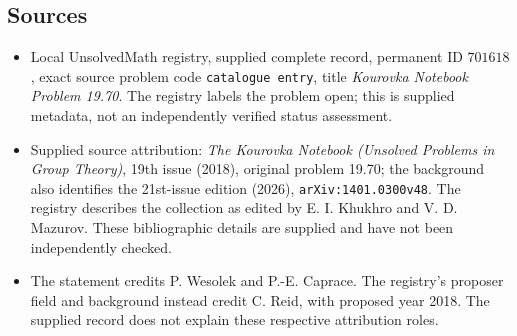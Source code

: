 \documentclass[11pt]{article}
\begin{document}
\subsection{Sources}
\begin{itemize}
\item Local UnsolvedMath registry, supplied complete record, permanent ID \(701618\), exact source problem code \texttt{catalogue entry}, title \emph{Kourovka Notebook Problem 19.70}. The registry labels the problem open; this is supplied metadata, not an independently verified status assessment.
\item Supplied source attribution: \emph{The Kourovka Notebook (Unsolved Problems in Group Theory)}, 19th issue (2018), original problem 19.70; the background also identifies the 21st-issue edition (2026), \texttt{arXiv:1401.0300v48}. The registry describes the collection as edited by E. I. Khukhro and V. D. Mazurov. These bibliographic details are supplied and have not been independently checked.
\item The statement credits P. Wesolek and P.-E. Caprace. The registry's proposer field and background instead credit C. Reid, with proposed year 2018. The supplied record does not explain these respective attribution roles.
\end{itemize}
\end{document}
